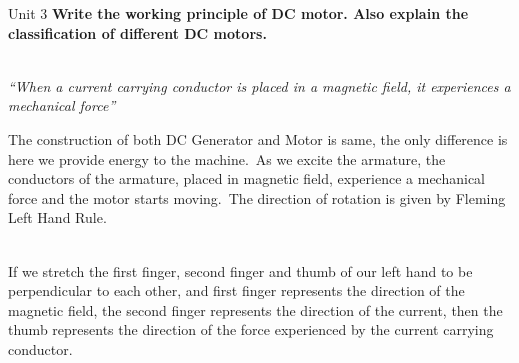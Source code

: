 \documentclass[11pt]{beamer}
\begin{document}
    \begin{frame}[t,allowframebreaks]{Unit 3}
        \textbf{\Large Write the working principle of DC motor. Also explain the classification of different DC
        motors.}\\[20pt]

        \begin{center}
            \underline{}\\[10pt]%
            \textit{``When a current carrying conductor is placed in a magnetic field, it experiences a mechanical
            force''}
        \end{center}

        The construction of both DC Generator and Motor is same, the only difference is here we provide energy to the
        machine.\ As we excite the armature, the conductors of the armature, placed in magnetic field, experience a
        mechanical force and the motor starts moving.\ The direction of rotation is given by Fleming Left Hand Rule.

        \framebreak

        \underline{}\\[10pt]
        If we stretch the first finger, second finger and thumb of our left hand to be perpendicular to each other,
        and first finger represents the direction of the magnetic field, the second finger represents the direction
        of the current, then the thumb represents the direction of the force experienced by the current carrying
        conductor.

        \\[10pt]

        \begin{center}
        \end{center}

        \framebreak

        \begin{center}
            \underline{}\\[10pt]%
        \end{center}


\end{frame}
\end{document}
